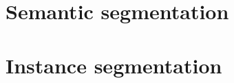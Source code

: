 
\section{Semantic segmentation}
\label{semantic-segmentation}


\section{Instance segmentation}
\label{instance-segmentation}


